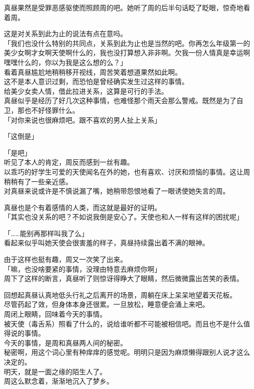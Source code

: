 真昼果然是受罪恶感驱使而照顾周的吧。她听了周的后半句话眨了眨眼，惊奇地看着周。

这是对关系到此为止的说法有点在意吗。\\

「我们也没什么特别的共同点，关系到此为止也是当然的吧。你再怎么年级第一的美少女啊才女啊天使啊什么的，我也没打算想入非非啊。欠我一份人情真是幸运啊嘿嘿什么的，你以为我是这么想的么？」\\

看着真昼尴尬地稍稍移开视线，周苦笑着想道果然如此啊。\\

这不是本人意识过剩，而恐怕是曾经确实发生过这样的事情。\\

给美少女卖人情，借此拉进关系，这算是可行的手法。\\

真昼似乎是经历了好几次这种事情，也难怪那个雨天会那么警戒。既然是为了自卫，那也不好怪罪什么。\\

「对你来说也很麻烦吧。跟不喜欢的男人扯上关系」

「这倒是」

「是吧」\\

听见了本人的肯定，周反而感到一丝有趣。\\

以乖巧的好学生可爱的天使闻名在外的她，也有喜欢、讨厌和烦恼的事情。这让周稍稍有了一些亲近感。\\

对真昼来说或许是不慎说漏了嘴，她稍带怨恨地看了一眼诱使她失言的周。

真昼也是个有着感情的人类，而这就是最好的证明。\\

「其实也没关系的吧？不如说我倒是安心了。天使也和人一样有这样的困扰呢」

「……能别再那样叫我了么」\\

看起来似乎叫她天使会很害羞的样子，真昼持续露出着不满的眼神。

由于这样也挺有趣，周又一次笑了出来。\\

「嘛，也没啥要紧的事情，没理由特意去麻烦你啊」\\

周下了这样的断言，真昼听了则惊讶得睁大了眼睛，然后微微露出苦笑的表情。\\

\vspace{2\baselineskip}

回想起真昼认真地低头行礼之后离开的场景，周躺在床上呆呆地望着天花板。\\

尽管药起了效，但身体本身还很累。一旦放松，睡意便会涌上来吧。\\

周闭上眼睛，回味着今天的事情。\\

被天使（毒舌系）照看了什么的，说给谁听都不可能被相信吧。而且也不是什么值得说的事情。\\

今天的事情，是周和真昼两人间的秘密。\\

秘密啊，用这个词心里有种痒痒的感觉呢。明明只是因为麻烦懒得跟别人说才这么决定的。\\

明天，就是一面之缘的陌生人了。\\

周这么默念着，渐渐地沉入了梦乡。
